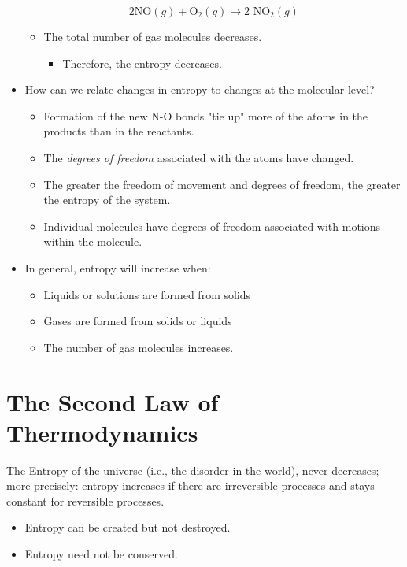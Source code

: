 \documentclass[10pt]{article}
\begin{document}
\begin{itemize}
    \[\text{2NO}(g) + \text{O}_2(g) \rightarrow \text{2 NO}_2(g)\]
    \begin{itemize}
        \item The total number of gas molecules decreases.
        \begin{itemize}
            \item Therefore, the entropy decreases.
        \end{itemize}
    \end{itemize}
    \item How can we relate changes in entropy to changes at the molecular level?
    \begin{itemize}
        \item Formation of the new N-O bonds "tie up" more of the atoms in the products than in the reactants.
        \item The \textit{degrees of freedom} associated with the atoms have changed.
        \item The greater the freedom of movement and degrees of freedom, the greater the entropy of the system.
        \item Individual molecules have degrees of freedom associated with motions within the molecule.
    \end{itemize}
    \item In general, entropy will increase when:
    \begin{itemize}
        \item Liquids or solutions are formed from solids
        \item Gases are formed from solids or liquids
        \item The number of gas molecules increases.
    \end{itemize}
\end{itemize}

\section*{The Second Law of Thermodynamics}
The Entropy of the universe (i.e., the disorder in the world), never decreases; more precisely: entropy increases if there are irreversible processes and stays constant for reversible processes.
\begin{itemize}
    \item Entropy can be created but not destroyed.
    \item Entropy need not be conserved.
\end{itemize}
\end{document}

